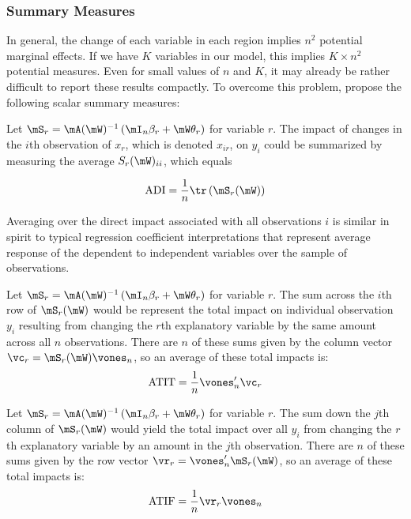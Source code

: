 \documentclass[english,12pt]{book}\usepackage[]{graphicx}\usepackage[]{xcolor}
\begin{document}
\subsubsection{Summary Measures}\label{sec:summary-measures}

In general, the change of each variable in each region implies $n^2$ potential marginal effects.  If we have $K$ variables in our model, this implies $K\times n^2$ potential measures. Even for small values of $n$ and $K$, it may already be rather difficult to report these results compactly. To overcome this problem, \citet[][p. 36-37]{lesage2010introduction} propose the following scalar summary measures: 

\begin{definition}\label{def:ADI}
Let $\mS_r = \mA(\mW)^{-1}\left(\mI_n\beta_r + \mW\theta_r\right)$ for variable $r$. The impact of changes in the $i$th observation of $x_r$, which is denoted $x_{ir}$, on $y_i$ could be summarized by measuring the average $S_r(\mW)_{ii}$, which equals
	
	\begin{equation}
		\mbox{ADI} = \frac{1}{n}\tr\left(\mS_r(\mW)\right)
	\end{equation}
\end{definition}


Averaging over the direct impact associated with all observations $i$ is similar in spirit to typical regression coefficient interpretations that represent average response of the dependent to independent variables over the sample of observations. 	

\begin{definition}\label{def:ATIT}
	Let $\mS_r = \mA(\mW)^{-1}\left(\mI_n\beta_r + \mW\theta_r\right)$ for variable $r$. The sum across the $i$th row of $\mS_r(\mW)$ would be represent the total impact on individual observation $y_i$ resulting from changing the $r$th explanatory variable by the same amount across all $n$ observations. There are $n$ of these sums given by the column vector $\vc_r = \mS_r(\mW)\vones_n$, so an average of these total impacts is:
		\begin{equation}
		\mbox{ATIT} = \frac{1}{n} \vones_n'\vc_r
		\end{equation} 
\end{definition}

\begin{definition}\label{def:ATIF}
	Let $\mS_r = \mA(\mW)^{-1}\left(\mI_n\beta_r + \mW\theta_r\right)$ for variable $r$. The sum down the $j$th column of $\mS_r(\mW)$ would yield the total impact over all $y_i$ from changing the $r$th explanatory variable by an amount in the $j$th observation. There are $n$ of these sums given by the row vector $\vr_r = \vones_n'\mS_{r}(\mW)$, so an average of these total impacts is:
				\begin{equation}
				\mbox{ATIF} = \frac{1}{n} \vr_r\vones_n
				\end{equation} 
\end{definition}
\end{document}
